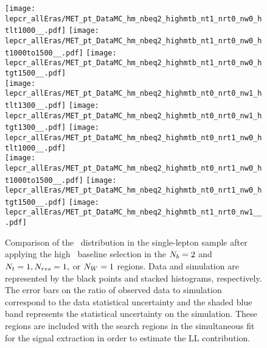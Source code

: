 \begin{figure}[!h]
	\begin{center}
  \texttt{[image: lepcr\_allEras/MET\_pt\_DataMC\_hm\_nbeq2\_highmtb\_nt1\_nrt0\_nw0\_htlt1000\_\_.pdf]}
  \texttt{[image: lepcr\_allEras/MET\_pt\_DataMC\_hm\_nbeq2\_highmtb\_nt1\_nrt0\_nw0\_ht1000to1500\_\_.pdf]}
  \texttt{[image: lepcr\_allEras/MET\_pt\_DataMC\_hm\_nbeq2\_highmtb\_nt1\_nrt0\_nw0\_htgt1500\_\_.pdf]} \\
  \texttt{[image: lepcr\_allEras/MET\_pt\_DataMC\_hm\_nbeq2\_highmtb\_nt0\_nrt0\_nw1\_htlt1300\_\_.pdf]} 
  \texttt{[image: lepcr\_allEras/MET\_pt\_DataMC\_hm\_nbeq2\_highmtb\_nt0\_nrt0\_nw1\_htgt1300\_\_.pdf]} 
  \texttt{[image: lepcr\_allEras/MET\_pt\_DataMC\_hm\_nbeq2\_highmtb\_nt0\_nrt1\_nw0\_htlt1000\_\_.pdf]} \\
  \texttt{[image: lepcr\_allEras/MET\_pt\_DataMC\_hm\_nbeq2\_highmtb\_nt0\_nrt1\_nw0\_ht1000to1500\_\_.pdf]} 
  \texttt{[image: lepcr\_allEras/MET\_pt\_DataMC\_hm\_nbeq2\_highmtb\_nt0\_nrt1\_nw0\_htgt1500\_\_.pdf]} 
  \texttt{[image: lepcr\_allEras/MET\_pt\_DataMC\_hm\_nbeq2\_highmtb\_nt1\_nrt0\_nw1\_\_.pdf]} \\
	\end{center}
	\caption[Lost Lepton HM Control Region $\nb=2$ with 1 heavy object]{Comparison of the \met~distribution in the single-lepton sample after applying the high \dm~baseline selection in the $\nb=2$ and $N_{t}=1, N_{res}=1,$ or $N_{W}=1$ regions. Data and simulation are represented by the black points and stacked histograms, respectively. The error bars on the ratio of observed data to simulation correspond to the data statistical uncertainty and the shaded blue band represents the statistical uncertainty on the simulation. These regions are included with the search regions in the simultaneous fit for the signal extraction in order to estimate the LL contribution.
	 }
	\label{fig:llb-1lcr-datavsmc-hm-nb2-1}
\end{figure}

